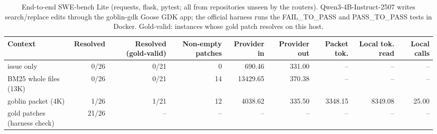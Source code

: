 \begin{table}[t]
\centering
\small
\begin{adjustbox}{max width=\linewidth}
\begin{tabular}{lrrrrrrrr}
\toprule
Context & Resolved & Resolved (gold-valid) & Non-empty patches & Provider in & Provider out & Packet tok. & Local tok. read & Local calls \\
\midrule
issue only & 0/26 & 0/21 & 0 & 690.46 & 331.00 & -- & -- & -- \\
BM25 whole files (13K) & 0/26 & 0/21 & 14 & 13429.65 & 370.38 & -- & -- & -- \\
goblin packet (4K) & 1/26 & 1/21 & 12 & 4038.62 & 335.50 & 3348.15 & 8349.08 & 25.00 \\
gold patches (harness check) & 21/26 & -- & -- & -- & -- & -- & -- & -- \\
\bottomrule
\end{tabular}
\end{adjustbox}
\caption{End-to-end SWE-bench Lite (requests, flask, pytest; all from repositories unseen by the routers). Qwen3-4B-Instruct-2507 writes search/replace edits through the goblin-gdk Goose GDK app; the official harness runs the FAIL\_TO\_PASS and PASS\_TO\_PASS tests in Docker. Gold-valid: instances whose gold patch resolves on this host.}
\label{tab:swebench-e2e}
\end{table}
